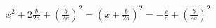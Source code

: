 \documentclass[preview]{standalone}
\begin{document}
\begin{center}
$x^2 + 2\frac{b}{2a} + \left( \frac{b}{2a} \right)^2 = \left( x + \frac{b}{2a} \right)^2 = - \frac{c}{a} + \left( \frac{b}{2a} \right)^2$
\end{center}
\end{document}
